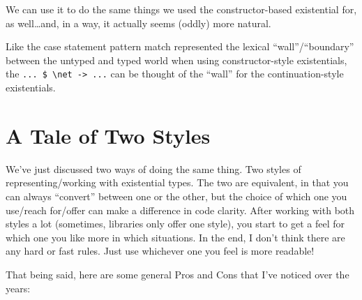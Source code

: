 \documentclass[]{article}
\newenvironment{Shaded}{\begin{snugshade}}{\end{snugshade}}
\newcommand{\CommentTok}[1]{\textcolor[rgb]{0.56,0.35,0.01}{\textit{#1}}}
\newcommand{\DataTypeTok}[1]{\textcolor[rgb]{0.13,0.29,0.53}{#1}}
\newcommand{\DecValTok}[1]{\textcolor[rgb]{0.00,0.00,0.81}{#1}}
\newcommand{\FunctionTok}[1]{\textcolor[rgb]{0.00,0.00,0.00}{#1}}
\newcommand{\KeywordTok}[1]{\textcolor[rgb]{0.13,0.29,0.53}{\textbf{#1}}}
\newcommand{\NormalTok}[1]{#1}
\newcommand{\OtherTok}[1]{\textcolor[rgb]{0.56,0.35,0.01}{#1}}
\newcommand{\StringTok}[1]{\textcolor[rgb]{0.31,0.60,0.02}{#1}}
\begin{document}
We can use it to do the same things we used the constructor-based existential
for, as well\ldots{}and, in a way, it actually seems (oddly) more natural.

\begin{Shaded}
\end{Shaded}

Like the case statement pattern match represented the lexical
``wall''/``boundary'' between the untyped and typed world when using
constructor-style existentials, the
\texttt{...\ \$\ \textbackslash{}net\ -\textgreater{}\ ...} can be thought of
the ``wall'' for the continuation-style existentials.

\hypertarget{a-tale-of-two-styles}{%
\section{A Tale of Two Styles}\label{a-tale-of-two-styles}}

We've just discussed two ways of doing the same thing. Two styles of
representing/working with existential types. The two are equivalent, in that you
can always ``convert'' between one or the other, but the choice of which one you
use/reach for/offer can make a difference in code clarity. After working with
both styles a lot (sometimes, libraries only offer one style), you start to get
a feel for which one you like more in which situations. In the end, I don't
think there are any hard or fast rules. Just use whichever one you feel is more
readable!

That being said, here are some general Pros and Cons that I've noticed over the
years:
\end{document}

